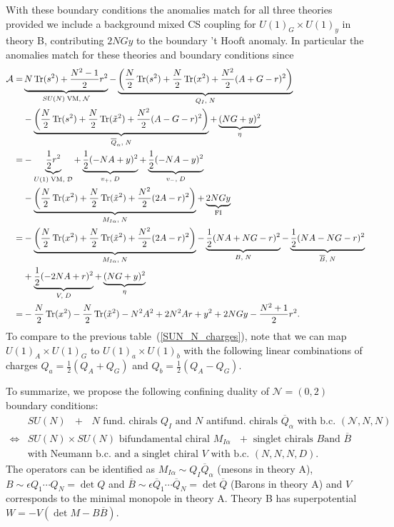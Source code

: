 \documentclass[12pt]{article}
\newcommand{\Acal}{\mathcal{A}}
\newcommand{\Dcal}{\mathcal{D}}
\newcommand{\Ncal}{\mathcal{N}}
\DeclareMathOperator*{\Tr}{{\rm Tr}}
\numberwithin{equation}{section}
\begin{document}
With these boundary conditions the anomalies match for all three theories provided we include a background mixed CS coupling for $U(1)_G \times U(1)_y$ in theory B, contributing $2NGy$ to the boundary 't Hooft anomaly. In particular the anomalies match for these theories and boundary conditions since
\begin{align}
\label{bdy_SUN_N_anom}
\Acal = &  \underbrace{N\Tr(s^2) + \frac{N^2 - 1}{2}r^2}_{SU(N) \; \textrm{VM}, \; \Ncal}
 - \underbrace{\left( \frac{N}{2} \Tr(s^2) + \frac{N}{2} \Tr(x^2) + \frac{N^2}{2}(A+G-r)^2 \right)}_{Q_I, \; N}
   \nonumber \\
 & - \underbrace{\left( \frac{N}{2} \Tr(s^2) + \frac{N}{2} \Tr(\tilde{x}^2) + \frac{N^2}{2}(A-G-r)^2 \right)}_{\overline{Q}_{\alpha}, \; N}
 + \underbrace{(NG + y)^2}_{\eta}
 \nonumber \\
  = & -\underbrace{\frac{1}{2}r^2}_{U(1) \; \textrm{VM}, \; \Dcal}
   + \underbrace{\frac{1}{2}(-NA + y)^2}_{v_{+}, \; D} + \underbrace{\frac{1}{2}(-NA - y)^2}_{v_{-}, \; D}
   \nonumber \\
 &  - \underbrace{\left( \frac{N}{2} \Tr(x^2) + \frac{N}{2} \Tr(\tilde{x}^2) + \frac{N^2}{2}(2A-r)^2 \right)}_{M_{I \alpha}, \; N}
   + \underbrace{2NGy}_{\textrm{FI}}
   \nonumber \\
  = & - \underbrace{\left( \frac{N}{2} \Tr(x^2) + \frac{N}{2} \Tr(\tilde{x}^2) + \frac{N^2}{2}(2A-r)^2 \right)}_{M_{I \alpha}, \; N}
   - \underbrace{\frac{1}{2}(NA + NG - r)^2}_{B, \; N}
   - \underbrace{\frac{1}{2}(NA - NG - r)^2}_{\overline{B}, \; N}
  \nonumber \\
  & + \underbrace{\frac{1}{2}(-2NA + r)^2}_{V, \; D} + \underbrace{(NG + y)^2}_{\eta}
 \nonumber \\
  = & - \frac{N}{2} \Tr(x^2) - \frac{N}{2} \Tr(\tilde{x}^2) - N^2 A^2 + 2N^2 Ar + y^2 + 2NGy - \frac{N^2 + 1}{2}r^2. 
\end{align}
To compare to the previous table~(\ref{SUN_N_charges}), note that we can map $U(1)_A \times U(1)_G$ to $U(1)_a \times U(1)_b$ with the following linear combinations of charges $Q_a = \frac{1}{2}(Q_A + Q_G)$ and $Q_b = \frac{1}{2}(Q_A - Q_G)$.

To summarize, we propose the following confining duality of $\mathcal{N}=(0,2)$ boundary conditions: 
\begin{align}
\label{bcdual_suNnfNnaN}
&\textrm{$SU(N)$ $+$ $N$ fund. chirals $Q_I$ and $N$ antifund. chirals $\overline{Q}_{\alpha}$ with b.c. $(\mathcal{N},N,N)$}
\nonumber\\
\Leftrightarrow &
\textrm{
$SU(N) \times SU(N)$ bifundamental chiral $M_{I \alpha}$ $+$ singlet chirals $B$
and $\overline{B}$
}
\nonumber\\
&\textrm{with Neumann b.c.\ and a singlet chiral $V$ with b.c. $(N,N,N,D)$}. 
\end{align}
The operators can be identified as $M_{I \alpha} \sim Q_I \overline{Q}_{\alpha}$ (mesons in theory A), $B \sim \epsilon Q_{1} \cdots Q_{N} = \det Q$ and
$\overline{B} \sim \epsilon \overline{Q}_1 \cdots \overline{Q}_N = \det \overline{Q}$ (Barons in theory A) and $V$ corresponds to the minimal monopole in theory A. Theory B has superpotential $W = -V (\det M - B\overline{B})$.
\end{document}
